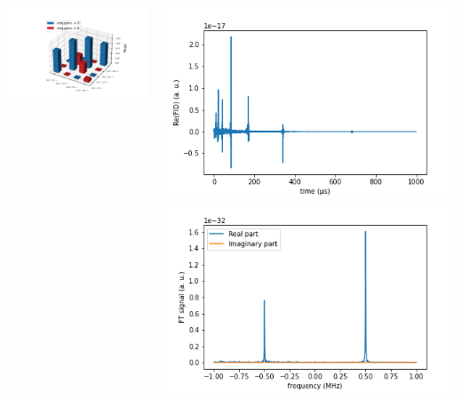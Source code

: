 \documentclass[10pt]{beamer}
\begin{document}
\begin{frame}
$$\begin{columns}[T]
\begin{column}{.5\textwidth}
\begin{column}{.5\textwidth}
\includegraphics[width=1.5\textwidth]{./spin1-2/14uncorrelated_mixed_hyperfineAnisotrop/EvolvedRealPartDensityMatrix.png}
\end{column}
\end{column}
\begin{column}{.5\textwidth}
\includegraphics[width=\textwidth]{./spin1-2/14uncorrelated_mixed_hyperfineAnisotrop/FIDSignal.png}
\includegraphics[width=\textwidth]{./spin1-2/14uncorrelated_mixed_hyperfineAnisotrop/FTSignal.png}
\end{column}
\end{columns}
\end{frame}
\end{document}
